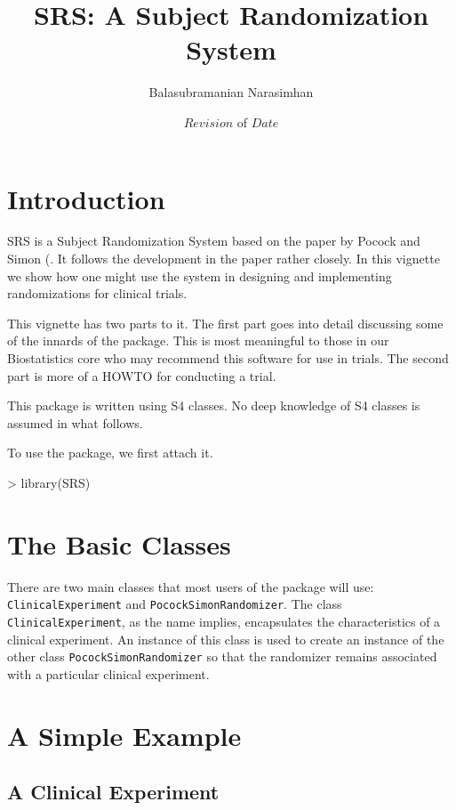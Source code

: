 \documentclass[11pt, letter]{article}
\title{SRS: A Subject Randomization System}
\author{Balasubramanian Narasimhan}
\date{$Revision$ of $Date$}
\numberwithin{equation}{section}
\begin{document}
\maketitle
\tableofcontents

\section{Introduction}
\label{sec:intro}

SRS is a Subject Randomization System based on the paper by Pocock and
Simon (\cite{ps:1975}. It follows the development in the paper rather
closely. In this vignette we show how one might use the system in
designing and implementing randomizations for clinical trials. 

This vignette has two parts to it. The first part goes into detail
discussing some of the innards of the package. This is most meaningful
to those in our Biostatistics core who may recommend this software for
use in trials.  The second part is more of a HOWTO for conducting a
trial.

This package is written using S4 classes. No deep knowledge of S4
classes is assumed in what follows.

To use the package, we first attach it.

\begin{Schunk}
\begin{Sinput}
> library(SRS)
\end{Sinput}
\end{Schunk}

\section{The Basic Classes}
\label{sec:basic-classes}
There are two main classes that most users of the package will use:
\texttt{ClinicalExperiment} and \texttt{PocockSimonRandomizer}. The
class \texttt{ClinicalExperiment}, as the name implies, encapsulates
the characteristics of a clinical experiment. An instance of this
class is used to create an instance of the other class
\texttt{PocockSimonRandomizer} so that the randomizer remains
associated with a particular clinical experiment.

\section{A Simple Example}
\label{sec:simple-example}

\subsection{A Clinical Experiment}
\label{sec:clin-expt}
\end{document}
